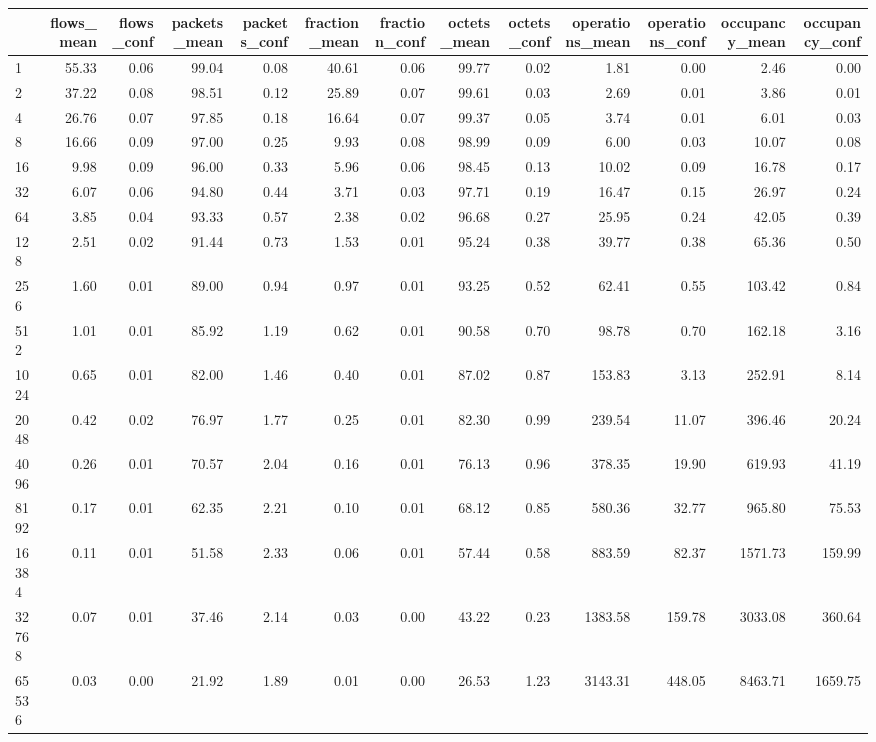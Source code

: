 \begin{tabular}{lrrrrrrrrrrrr}
\toprule
 & flows_mean & flows_conf & packets_mean & packets_conf & fraction_mean & fraction_conf & octets_mean & octets_conf & operations_mean & operations_conf & occupancy_mean & occupancy_conf \\
\midrule
1 & 55.33 & 0.06 & 99.04 & 0.08 & 40.61 & 0.06 & 99.77 & 0.02 & 1.81 & 0.00 & 2.46 & 0.00 \\
2 & 37.22 & 0.08 & 98.51 & 0.12 & 25.89 & 0.07 & 99.61 & 0.03 & 2.69 & 0.01 & 3.86 & 0.01 \\
4 & 26.76 & 0.07 & 97.85 & 0.18 & 16.64 & 0.07 & 99.37 & 0.05 & 3.74 & 0.01 & 6.01 & 0.03 \\
8 & 16.66 & 0.09 & 97.00 & 0.25 & 9.93 & 0.08 & 98.99 & 0.09 & 6.00 & 0.03 & 10.07 & 0.08 \\
16 & 9.98 & 0.09 & 96.00 & 0.33 & 5.96 & 0.06 & 98.45 & 0.13 & 10.02 & 0.09 & 16.78 & 0.17 \\
32 & 6.07 & 0.06 & 94.80 & 0.44 & 3.71 & 0.03 & 97.71 & 0.19 & 16.47 & 0.15 & 26.97 & 0.24 \\
64 & 3.85 & 0.04 & 93.33 & 0.57 & 2.38 & 0.02 & 96.68 & 0.27 & 25.95 & 0.24 & 42.05 & 0.39 \\
128 & 2.51 & 0.02 & 91.44 & 0.73 & 1.53 & 0.01 & 95.24 & 0.38 & 39.77 & 0.38 & 65.36 & 0.50 \\
256 & 1.60 & 0.01 & 89.00 & 0.94 & 0.97 & 0.01 & 93.25 & 0.52 & 62.41 & 0.55 & 103.42 & 0.84 \\
512 & 1.01 & 0.01 & 85.92 & 1.19 & 0.62 & 0.01 & 90.58 & 0.70 & 98.78 & 0.70 & 162.18 & 3.16 \\
1024 & 0.65 & 0.01 & 82.00 & 1.46 & 0.40 & 0.01 & 87.02 & 0.87 & 153.83 & 3.13 & 252.91 & 8.14 \\
2048 & 0.42 & 0.02 & 76.97 & 1.77 & 0.25 & 0.01 & 82.30 & 0.99 & 239.54 & 11.07 & 396.46 & 20.24 \\
4096 & 0.26 & 0.01 & 70.57 & 2.04 & 0.16 & 0.01 & 76.13 & 0.96 & 378.35 & 19.90 & 619.93 & 41.19 \\
8192 & 0.17 & 0.01 & 62.35 & 2.21 & 0.10 & 0.01 & 68.12 & 0.85 & 580.36 & 32.77 & 965.80 & 75.53 \\
16384 & 0.11 & 0.01 & 51.58 & 2.33 & 0.06 & 0.01 & 57.44 & 0.58 & 883.59 & 82.37 & 1571.73 & 159.99 \\
32768 & 0.07 & 0.01 & 37.46 & 2.14 & 0.03 & 0.00 & 43.22 & 0.23 & 1383.58 & 159.78 & 3033.08 & 360.64 \\
65536 & 0.03 & 0.00 & 21.92 & 1.89 & 0.01 & 0.00 & 26.53 & 1.23 & 3143.31 & 448.05 & 8463.71 & 1659.75 \\

\end{tabular}
